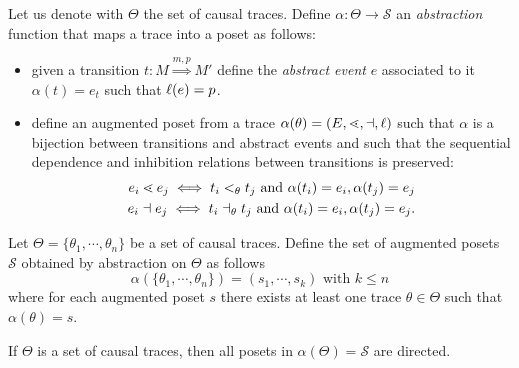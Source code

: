 \begin{definition}
  \label{def:abstraction}
  Let us denote with $\Theta$ the set of causal traces.
  Define $\alpha:\Theta\to\mathcal{S}$ an \emph{abstraction} function that maps a trace into a poset as follows:
    \begin{itemize}
    \item given a transition $t:M\overset{m,p}{\Rightarrow} M'$ define the \emph{abstract event} $e$ associated to it
      $\alpha(t) = e_t$ such that $\ell(e) = p$.
    \item define an augmented poset from a trace $\alpha(\theta) = (E,\lessdot,\dashv,\ell)$ such that $\alpha$ is a bijection between transitions and abstract events and such that the sequential dependence and inhibition relations between transitions is preserved:
      \begin{align*}
        e_i \lessdot e_j \iff t_i <_{\theta} t_j \text{ and } \alpha(t_i)=e_i, \alpha(t_j)=e_j\\
        e_i \dashv e_j \iff t_i \dashv_{\theta} t_j \text{ and } \alpha(t_i)=e_i, \alpha(t_j)=e_j.
      \end{align*}
    \end{itemize}
    Let $\Theta = \{\theta_1,\cdots,\theta_n\}$ be a set of causal traces.
    Define the set of augmented posets $\mathcal{S}$ obtained by abstraction on $\Theta$ as follows
    \[
    \alpha(\{\theta_1,\cdots,\theta_n\}) = (s_1,\cdots, s_k)\text{ with }k\leq n
    \]
    where for each augmented poset $s$ there exists at least one trace $\theta\in\Theta$ such that $\alpha(\theta) = s$.
\end{definition}

\begin{property}
  If $\Theta$ is a set of causal traces, then all posets in $\alpha(\Theta)=\mathcal{S}$ are directed.
\end{property}

